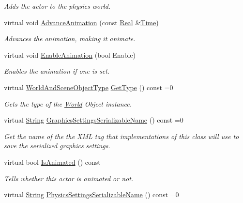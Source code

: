 \begin{DoxyCompactItemize}
\begin{DoxyCompactList}\small\item\em Adds the actor to the physics world. \end{DoxyCompactList}\item 
virtual void \hyperlink{classMezzanine_1_1ActorBase_ab245d50e649ec7335bbfcba86d9dc889}{Advance\-Animation} (const \hyperlink{namespaceMezzanine_a726731b1a7df72bf3583e4a97282c6f6}{Real} \&\hyperlink{structMezzanine_1_1Time}{Time})
\begin{DoxyCompactList}\small\item\em Advances the animation, making it animate. \end{DoxyCompactList}\item 
virtual void \hyperlink{classMezzanine_1_1ActorBase_a28c9397e90ec680faf61845525312864}{Enable\-Animation} (bool Enable)
\begin{DoxyCompactList}\small\item\em Enables the animation if one is set. \end{DoxyCompactList}\item 
virtual \hyperlink{namespaceMezzanine_ae8cd04f706f4998be62f454b7119c718}{World\-And\-Scene\-Object\-Type} \hyperlink{classMezzanine_1_1ActorBase_a83f7356d743f1b59ea58aac6d7570901}{Get\-Type} () const =0
\begin{DoxyCompactList}\small\item\em Gets the type of the \hyperlink{classMezzanine_1_1World}{World} Object instance.  \end{DoxyCompactList}\item 
virtual \hyperlink{namespaceMezzanine_acf9fcc130e6ebf08e3d8491aebcf1c86}{String} \hyperlink{classMezzanine_1_1ActorBase_a636a0dbf78907d565d4cabd994442637}{Graphics\-Settings\-Serializable\-Name} () const =0
\begin{DoxyCompactList}\small\item\em Get the name of the the X\-M\-L tag that implementations of this class will use to save the serialized graphics settings. \end{DoxyCompactList}\item 
virtual bool \hyperlink{classMezzanine_1_1ActorBase_ade1c3e7a2e24df64a79d2acb8d6fc084}{Is\-Animated} () const 
\begin{DoxyCompactList}\small\item\em Tells whether this actor is animated or not. \end{DoxyCompactList}\item 
virtual \hyperlink{namespaceMezzanine_acf9fcc130e6ebf08e3d8491aebcf1c86}{String} \hyperlink{classMezzanine_1_1ActorBase_a7a18ac81a996e2d68057223ebbc7959c}{Physics\-Settings\-Serializable\-Name} () const =0

\end{DoxyCompactItemize}
